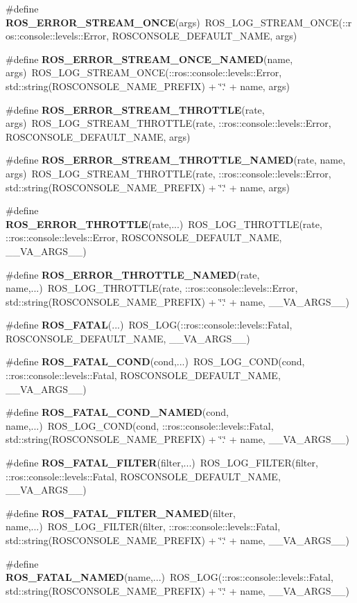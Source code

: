 \begin{DoxyCompactItemize}
\#define {\bf ROS\_\-ERROR\_\-STREAM\_\-ONCE}(args)~ROS\_\-LOG\_\-STREAM\_\-ONCE(::ros::console::levels::Error, ROSCONSOLE\_\-DEFAULT\_\-NAME, args)
\item 
\#define {\bf ROS\_\-ERROR\_\-STREAM\_\-ONCE\_\-NAMED}(name, args)~ROS\_\-LOG\_\-STREAM\_\-ONCE(::ros::console::levels::Error, std::string(ROSCONSOLE\_\-NAME\_\-PREFIX) + \char`\"{}.\char`\"{} + name, args)
\item 
\#define {\bf ROS\_\-ERROR\_\-STREAM\_\-THROTTLE}(rate, args)~ROS\_\-LOG\_\-STREAM\_\-THROTTLE(rate, ::ros::console::levels::Error, ROSCONSOLE\_\-DEFAULT\_\-NAME, args)
\item 
\#define {\bf ROS\_\-ERROR\_\-STREAM\_\-THROTTLE\_\-NAMED}(rate, name, args)~ROS\_\-LOG\_\-STREAM\_\-THROTTLE(rate, ::ros::console::levels::Error, std::string(ROSCONSOLE\_\-NAME\_\-PREFIX) + \char`\"{}.\char`\"{} + name, args)
\item 
\#define {\bf ROS\_\-ERROR\_\-THROTTLE}(rate,...)~ROS\_\-LOG\_\-THROTTLE(rate, ::ros::console::levels::Error, ROSCONSOLE\_\-DEFAULT\_\-NAME, \_\-\_\-VA\_\-ARGS\_\-\_\-)
\item 
\#define {\bf ROS\_\-ERROR\_\-THROTTLE\_\-NAMED}(rate, name,...)~ROS\_\-LOG\_\-THROTTLE(rate, ::ros::console::levels::Error, std::string(ROSCONSOLE\_\-NAME\_\-PREFIX) + \char`\"{}.\char`\"{} + name, \_\-\_\-VA\_\-ARGS\_\-\_\-)
\item 
\#define {\bf ROS\_\-FATAL}(...)~ROS\_\-LOG(::ros::console::levels::Fatal, ROSCONSOLE\_\-DEFAULT\_\-NAME, \_\-\_\-VA\_\-ARGS\_\-\_\-)
\item 
\#define {\bf ROS\_\-FATAL\_\-COND}(cond,...)~ROS\_\-LOG\_\-COND(cond, ::ros::console::levels::Fatal, ROSCONSOLE\_\-DEFAULT\_\-NAME, \_\-\_\-VA\_\-ARGS\_\-\_\-)
\item 
\#define {\bf ROS\_\-FATAL\_\-COND\_\-NAMED}(cond, name,...)~ROS\_\-LOG\_\-COND(cond, ::ros::console::levels::Fatal, std::string(ROSCONSOLE\_\-NAME\_\-PREFIX) + \char`\"{}.\char`\"{} + name, \_\-\_\-VA\_\-ARGS\_\-\_\-)
\item 
\#define {\bf ROS\_\-FATAL\_\-FILTER}(filter,...)~ROS\_\-LOG\_\-FILTER(filter, ::ros::console::levels::Fatal, ROSCONSOLE\_\-DEFAULT\_\-NAME, \_\-\_\-VA\_\-ARGS\_\-\_\-)
\item 
\#define {\bf ROS\_\-FATAL\_\-FILTER\_\-NAMED}(filter, name,...)~ROS\_\-LOG\_\-FILTER(filter, ::ros::console::levels::Fatal, std::string(ROSCONSOLE\_\-NAME\_\-PREFIX) + \char`\"{}.\char`\"{} + name, \_\-\_\-VA\_\-ARGS\_\-\_\-)
\item 
\#define {\bf ROS\_\-FATAL\_\-NAMED}(name,...)~ROS\_\-LOG(::ros::console::levels::Fatal, std::string(ROSCONSOLE\_\-NAME\_\-PREFIX) + \char`\"{}.\char`\"{} + name, \_\-\_\-VA\_\-ARGS\_\-\_\-)

\end{DoxyCompactItemize}
